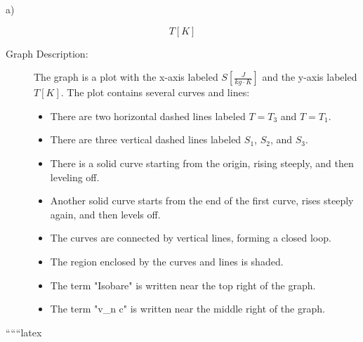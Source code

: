 a)

\[
T \left[ K \right]
\]

\begin{description}
    \item[Graph Description:] The graph is a plot with the x-axis labeled \( S \left[ \frac{J}{kg \cdot K} \right] \) and the y-axis labeled \( T \left[ K \right] \). The plot contains several curves and lines:
    \begin{itemize}
        \item There are two horizontal dashed lines labeled \( T = T_3 \) and \( T = T_1 \).
        \item There are three vertical dashed lines labeled \( S_1 \), \( S_2 \), and \( S_3 \).
        \item There is a solid curve starting from the origin, rising steeply, and then leveling off.
        \item Another solid curve starts from the end of the first curve, rises steeply again, and then levels off.
        \item The curves are connected by vertical lines, forming a closed loop.
        \item The region enclosed by the curves and lines is shaded.
        \item The term "Isobare" is written near the top right of the graph.
        \item The term "v_n c" is written near the middle right of the graph.
    \end{itemize}
\end{description}

``````latex
